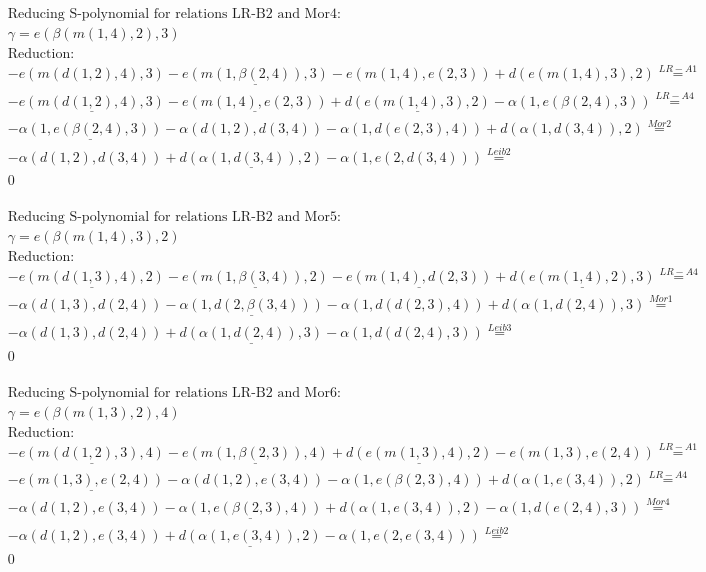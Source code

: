 \documentclass[11pt]{amsart}
\begin{document}
\begin{align*} 
& \text{Reducing S-polynomial for relations LR-B2 and Mor4:} \\ 
& \gamma = e(\beta(m(1,4),2),3) \\ 
& \text{Reduction}: \\& - e(m(d(1,2),4),3) - \underline{e(m(1,\beta(2,4)),3)} - e(m(1,4),e(2,3)) + d(e(m(1,4),3),2) \stackrel{ LR-A1 }{=}  \\ 
& - \underline{e(m(d(1,2),4),3)} - \underline{e(m(1,4),e(2,3))} + \underline{d(e(m(1,4),3),2)} - \alpha(1,e(\beta(2,4),3)) \stackrel{ LR-A4 }{=}  \\ 
& - \underline{\alpha(1,e(\beta(2,4),3))} - \alpha(d(1,2),d(3,4)) - \alpha(1,d(e(2,3),4)) + d(\alpha(1,d(3,4)),2) \stackrel{ Mor2 }{=}  \\ 
& - \alpha(d(1,2),d(3,4)) + \underline{d(\alpha(1,d(3,4)),2)} - \alpha(1,e(2,d(3,4))) \stackrel{ Leib2 }{=}  \\ 
&0\\ 
\end{align*} 
 
\begin{align*} 
& \text{Reducing S-polynomial for relations LR-B2 and Mor5:} \\ 
& \gamma = e(\beta(m(1,4),3),2) \\ 
& \text{Reduction}: \\& - \underline{e(m(d(1,3),4),2)} - \underline{e(m(1,\beta(3,4)),2)} - \underline{e(m(1,4),d(2,3))} + \underline{d(e(m(1,4),2),3)} \stackrel{ LR-A4 }{=}  \\ 
& - \alpha(d(1,3),d(2,4)) - \underline{\alpha(1,d(2,\beta(3,4)))} - \alpha(1,d(d(2,3),4)) + d(\alpha(1,d(2,4)),3) \stackrel{ Mor1 }{=}  \\ 
& - \alpha(d(1,3),d(2,4)) + \underline{d(\alpha(1,d(2,4)),3)} - \alpha(1,d(d(2,4),3)) \stackrel{ Leib3 }{=}  \\ 
&0\\ 
\end{align*} 
 
\begin{align*} 
& \text{Reducing S-polynomial for relations LR-B2 and Mor6:} \\ 
& \gamma = e(\beta(m(1,3),2),4) \\ 
& \text{Reduction}: \\& - \underline{e(m(d(1,2),3),4)} - \underline{e(m(1,\beta(2,3)),4)} + \underline{d(e(m(1,3),4),2)} - e(m(1,3),e(2,4)) \stackrel{ LR-A1 }{=}  \\ 
& - \underline{e(m(1,3),e(2,4))} - \alpha(d(1,2),e(3,4)) - \alpha(1,e(\beta(2,3),4)) + d(\alpha(1,e(3,4)),2) \stackrel{ LR-A4 }{=}  \\ 
& - \alpha(d(1,2),e(3,4)) - \underline{\alpha(1,e(\beta(2,3),4))} + d(\alpha(1,e(3,4)),2) - \alpha(1,d(e(2,4),3)) \stackrel{ Mor4 }{=}  \\ 
& - \alpha(d(1,2),e(3,4)) + \underline{d(\alpha(1,e(3,4)),2)} - \alpha(1,e(2,e(3,4))) \stackrel{ Leib2 }{=}  \\ 
&0\\ 
\end{align*} 
 
\end{document}
